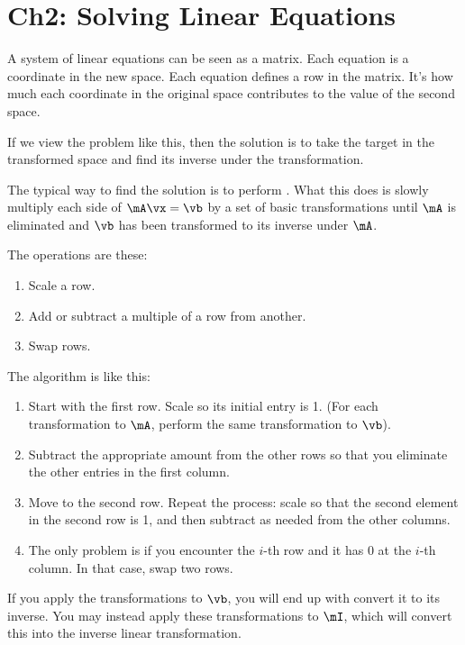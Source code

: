 \section{Ch2: Solving Linear Equations}

A system of linear equations can be seen as a matrix. Each equation is
a coordinate in the new space. Each equation defines a row in the
matrix. It's how much each coordinate in the original space
contributes to the value of the second space.

If we view the problem like this, then the solution is to take the
target in the transformed space and find its inverse under the
transformation.

The typical way to find the solution is to perform . What this does is slowly multiply each side of $\mA\vx =
\vb$ by a set of basic transformations until $\mA$ is eliminated and
$\vb$ has been transformed to its inverse under $\mA$.

The operations are these:

\begin{enumerate}
  \item Scale a row.
  \item Add or subtract a multiple of a row from another.
  \item Swap rows.
\end{enumerate}

The algorithm is like this:

\begin{enumerate}
  \item Start with the first row. Scale so its initial entry is 1. (For
  each transformation to $\mA$, perform the same transformation to
  $\vb$).

  \item Subtract the appropriate amount from the other rows so that you
  eliminate the other entries in the first column.

  \item Move to the second row. Repeat the process: scale so that the
  second element in the second row is 1, and then subtract as needed
  from the other columns.

  \item The only problem is if you encounter the $i$-th row and it has
  0 at the $i$-th column. In that case, swap two rows.
\end{enumerate}

If you apply the transformations to $\vb$, you will end up with convert
it to its inverse. You may instead apply these transformations to $\mI$,
which will convert this into the inverse linear transformation.

